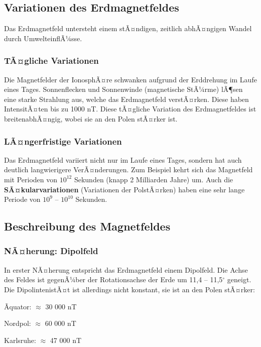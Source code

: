 \subsection{Variationen des Erdmagnetfeldes}
Das Erdmagnetfeld untersteht einem stÃ¤ndigen, zeitlich abhÃ¤ngigen Wandel durch UmwelteinflÃ¼sse.

\subsubsection{TÃ¤gliche Variationen}
Die Magnetfelder der IonosphÃ¤re schwanken aufgrund der Erddrehung im Laufe eines Tages.
Sonnenflecken und Sonnenwinde (magnetische StÃ¼rme) lÃ¶sen eine starke Strahlung aus, welche das Erdmagnetfeld verstÃ¤rken. Diese haben IntensitÃ¤ten bis zu 1000 nT. Diese tÃ¤gliche Variation des Erdmagnetfeldes ist breitenabhÃ¤ngig, wobei sie an den Polen stÃ¤rker ist.

\subsubsection{LÃ¤ngerfristige Variationen}
Das Erdmagnetfeld variiert nicht nur im Laufe eines Tages, sondern hat auch deutlich langwierigere VerÃ¤nderungen. Zum Beispiel kehrt sich das Magnetfeld mit Perioden von $10^{12}$ Sekunden (knapp 2 Milliarden Jahre) um. Auch die \textbf{SÃ¤kularvariationen} (Variationen der PolstÃ¤rken) haben eine sehr lange Periode von $10^9$ -- $10^{10}$ Sekunden.

\subsection{Beschreibung des Magnetfeldes}
\subsubsection{NÃ¤herung: Dipolfeld}
In erster NÃ¤herung entspricht das Erdmagnetfeld einem Dipolfeld. Die Achse des Feldes ist gegenÃ¼ber der Rotationsachse der Erde um 11,4 -- 11,5$^{\circ}$ geneigt. 
Die DipolintenistÃ¤t ist allerdings nicht konstant, sie ist an den Polen stÃ¤rker: \begin{description}
	\item Ãquator: $\approx$ 30 000 nT
	\item Nordpol: $\approx$ 60 000 nT
	\item Karlsruhe: $\approx$ 47 000 nT
\end{description}

